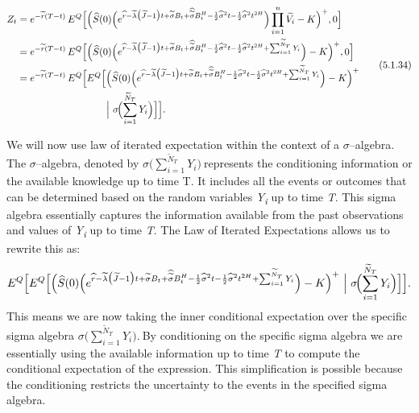 \documentclass[12pt,a4paper]{report}
\numberwithin{equation}{section}
\begin{document}
\begin{equation}
\begin{aligned}
Z_{t}
&= e^{-\widetilde{r}(T-t)}\,E^{Q}\Bigl[\Bigl(\widehat{S}(0)\Bigl(e^{\widehat{r}-\widetilde{\lambda}\bigl(\widetilde{J}-1\bigr)t
+\widetilde{\sigma}B_{t}+\widehat{\widetilde{\sigma}}B_{t}^{H}
-\frac{1}{2}\widehat{\sigma}^{2}t-\frac{1}{2}\widehat{\sigma}^{2}t^{2H}}\Bigr)
\prod_{i=1}^{n}\widetilde{V_{i}}-K\Bigr)^{+},0\Bigr] \\
&= e^{-\widetilde{r}(T-t)}\,E^{Q}\Bigl[\Bigl(\widehat{S}(0)\Bigl(e^{\widehat{r}-\widetilde{\lambda}\bigl(\widetilde{J}-1\bigr)t
+\widetilde{\sigma}B_{t}+\widehat{\widetilde{\sigma}}B_{t}^{H}
-\frac{1}{2}\widehat{\sigma}^{2}t-\frac{1}{2}\widehat{\sigma}^{2}t^{2H}
+\sum_{i=1}^{{\widetilde{N}}_{T}}Y_{i}}\Bigr)-K\Bigr)^{+},0\Bigr] \\
&= e^{-\widetilde{r}(T-t)}\,E^{Q}\Bigl[
E^{Q}\Bigl[\Bigl(\widehat{S}(0)\Bigl(e^{\widehat{r}-\widetilde{\lambda}\bigl(\widetilde{J}-1\bigr)t
+\widetilde{\sigma}B_{t}+\widehat{\widetilde{\sigma}}B_{t}^{H}
-\frac{1}{2}\widehat{\sigma}^{2}t-\frac{1}{2}\widehat{\sigma}^{2}t^{2H}
+\sum_{i=1}^{{\widetilde{N}}_{T}}Y_{i}}\Bigr)-K\Bigr)^{+} \\
&\hspace{3.2cm}\Big|\ \sigma\!\Bigl(\sum_{i=1}^{{\widetilde{N}}_{T}}Y_{i}\Bigr)\Bigr]\Bigr].
\end{aligned}
\tag{5.1.34}\label{eq:5.1.34}
\end{equation}



We will now use law of iterated expectation within the context of a
$\sigma$--algebra. The $\sigma$--algebra, denoted by
\(\sigma(\sum_{i = 1}^{{\widetilde{N}}_{T}}{Y_{i})}\ \)represents the
conditioning information or the available knowledge up to time T. It
includes all the events or outcomes that can be determined based on the
random variables \emph{Y\textsubscript{i}} up to time \emph{T}. This
sigma algebra essentially captures the information available from the
past observations and values of \emph{Y\textsubscript{i}} up to time
\emph{T}. The Law of Iterated Expectations allows us to rewrite this as:
\[
\begin{aligned}
E^{Q}\Bigl[
E^{Q}\Bigl[
\Bigl(\widehat{S}(0)\Bigl(e^{\widehat{r}-\widetilde{\lambda}\bigl(\widetilde{J}-1\bigr)t
+\widetilde{\sigma}B_{t}+\widehat{\widetilde{\sigma}}B_{t}^{H}
-\frac{1}{2}\widehat{\sigma}^{2}t-\frac{1}{2}\widehat{\sigma}^{2}t^{2H}
+\sum_{i=1}^{{\widetilde{N}}_{T}}Y_{i}}\Bigr)-K\Bigr)^{+}
\ \Big|\ \sigma\!\Bigl(\sum_{i=1}^{{\widetilde{N}}_{T}}Y_{i}\Bigr)
\Bigr]\Bigr].
\end{aligned}
\]
This
means we are now taking the inner conditional expectation over the
specific sigma algebra
\(\sigma(\sum_{i = 1}^{{\widetilde{N}}_{T}}{Y_{i}).}\ \)By conditioning
on the specific sigma algebra we are essentially using the available
information up to time \emph{T} to compute the conditional expectation
of the expression. This simplification is possible because the
conditioning restricts the uncertainty to the events in the specified
sigma algebra.
\end{document}
